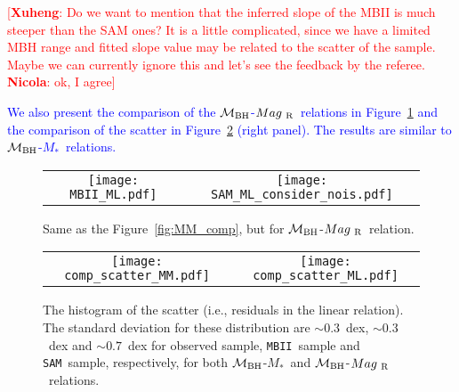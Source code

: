 \documentclass[twocolumn,trackchanges]{aastex63}
\newcommand{\mbh}{$\mathcal M_{\rm BH}$}
\newcommand{\mr}{$Mag_{\rm ~R}$}
\newcommand{\mstar}{{$M_*$}}
\newcommand{\sam}{\texttt{SAM}}
\newcommand{\mbii}{\texttt{MBII}}
\newcommand{\ding}[1]{\textcolor{red}{[{\bf Xuheng}: #1]}}
\newcommand{\blue}[1]{{ \textcolor{blue}{#1}}}
\begin{document}
 \ding{Do we want to mention that the inferred slope of the MBII is much steeper than the SAM ones? It is a little complicated, since we have a limited MBH range and fitted slope value may be related to the scatter of the sample. Maybe we can currently ignore this and let's see the feedback by the referee. {\bf Nicola}: ok, I agree}

\blue{We also present the comparison of the \mbh-\mr\ relations in Figure~\ref{fig:ML_comp} and the comparison of the scatter in Figure~\ref{fig:offset_comp} (right panel). The results are similar to \mbh-\mstar\ relations.}

\begin{figure*}[t]%
\begin{tabular}{c c}
\texttt{[image: MBII\_ML.pdf]} &
\texttt{[image: SAM\_ML\_consider\_nois.pdf]} \\
\end{tabular}
\caption{Same as the Figure~\ref{fig:MM_comp}, but for \mbh-\mr\ relation.}
\label{fig:ML_comp}
\end{figure*}


\begin{figure*}[t]%
\begin{tabular}{c c}
\texttt{[image: comp\_scatter\_MM.pdf]} &
\texttt{[image: comp\_scatter\_ML.pdf]} \\
\end{tabular}
\caption{The histogram of the scatter (i.e., residuals in the linear relation). The standard deviation for these distribution are $\sim0.3$~dex, $\sim0.3$~dex and $\sim0.7$~dex for observed sample, \mbii\ sample and \sam\ sample, respectively, for both \mbh-\mstar\ and \mbh-\mr\ relations.
}
\label{fig:offset_comp}
\end{figure*}
\end{document}
